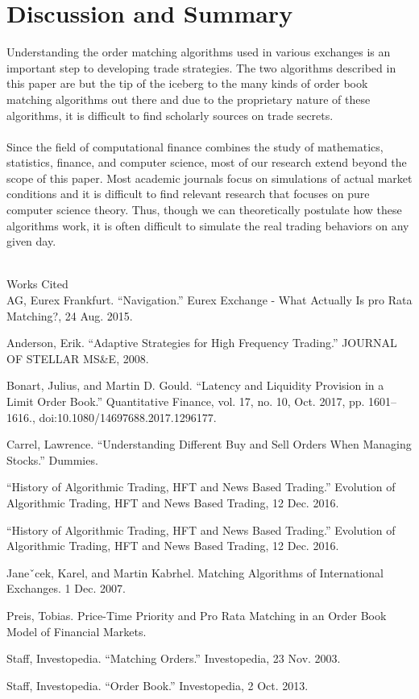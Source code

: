 \documentclass{article}
\begin{document}
\section{Discussion and Summary}
Understanding the order matching algorithms used in various exchanges is an important step to developing trade strategies.
The two algorithms described in this paper are but the tip of the iceberg to the many kinds of order book matching algorithms out there and due to the proprietary nature of these algorithms, it is difficult to find scholarly sources on trade secrets.\\\\
Since the field of computational finance combines the study of mathematics, statistics, finance, and computer science, most of our research extend beyond the scope of this paper. Most academic journals focus on simulations of actual market conditions and it is difficult to find relevant research that focuses on pure computer science theory. Thus, though we can theoretically postulate how these algorithms work, it is often difficult to simulate the real trading behaviors on any given day.\\\\

\newpage


                

\begin{hangparas}{.25in}{1}

Works Cited
\\ 

AG, Eurex Frankfurt. “Navigation.” Eurex Exchange - What Actually Is pro Rata Matching?, 24 Aug. 2015.

Anderson, Erik. “Adaptive Strategies for High Frequency Trading.” JOURNAL OF STELLAR MS&E, 2008.

Bonart, Julius, and Martin D. Gould. “Latency and Liquidity Provision in a Limit Order Book.” Quantitative Finance, vol. 17, no. 10, Oct. 2017, pp. 1601–1616., doi:10.1080/14697688.2017.1296177.

Carrel, Lawrence. “Understanding Different Buy and Sell Orders When Managing Stocks.” Dummies.

“History of Algorithmic Trading, HFT and News Based Trading.” Evolution of Algorithmic Trading, HFT and News Based Trading, 12 Dec. 2016.

“History of Algorithmic Trading, HFT and News Based Trading.” Evolution of Algorithmic Trading, HFT and News Based Trading, 12 Dec. 2016.

Janeˇcek, Karel, and Martin Kabrhel. Matching Algorithms of International Exchanges. 1 Dec. 2007.

Preis, Tobias. Price-Time Priority and Pro Rata Matching in an Order Book Model of Financial Markets.

Staff, Investopedia. “Matching Orders.” Investopedia, 23 Nov. 2003.

Staff, Investopedia. “Order Book.” Investopedia, 2 Oct. 2013.
\end{hangparas}
\end{document}
